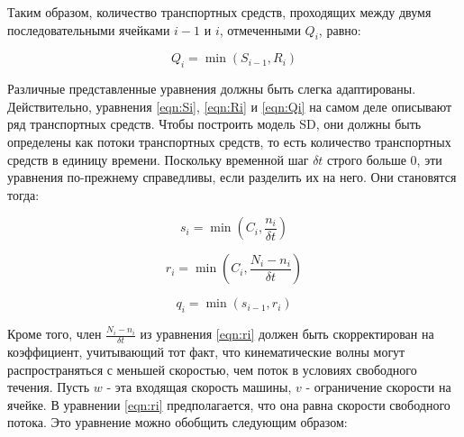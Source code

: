 
Таким образом, количество транспортных средств, проходящих между двумя последовательными ячейками $i−1$ и $i$, отмеченными $Q_i$, равно:

\begin{equation}
    \label{eqn:Qi}
    Q_i = \min(S_{i−1},R_i)
\end{equation}


Различные представленные уравнения должны быть слегка адаптированы. Действительно, уравнения \ref{eqn:Si}, \ref{eqn:Ri} и \ref{eqn:Qi} на самом деле описывают ряд транспортных средств. Чтобы построить модель SD, они должны быть определены как потоки транспортных средств, то есть количество транспортных средств в единицу времени. Поскольку временной шаг $\delta t$ строго больше 0, эти уравнения по-прежнему справедливы, если разделить их на него. Они становятся тогда:

\begin{equation}
    \label{eqn:si}
    s_i = \min(C_i, \frac{n_i}{\delta t})
\end{equation}

\begin{equation}
    \label{eqn:ri}
    r_i = \min(C_i, \frac{N_i − n_i}{\delta t})
\end{equation}

\begin{equation}
    \label{eqn:qi}
    q_i = \min(s_{i−1}, r_i)
\end{equation}


Кроме того, член $\frac{N_i − n_i}{\delta t}$ из уравнения \ref{eqn:ri} должен быть скорректирован на коэффициент, учитывающий тот факт, что кинематические волны могут распространяться с меньшей скоростью, чем поток в условиях свободного течения. Пусть $w$ - эта входящая скорость машины, $v$ - ограничение скорости на ячейке. В уравнении \ref{eqn:ri} предполагается, что она равна скорости свободного потока. Это уравнение можно обобщить следующим образом:

